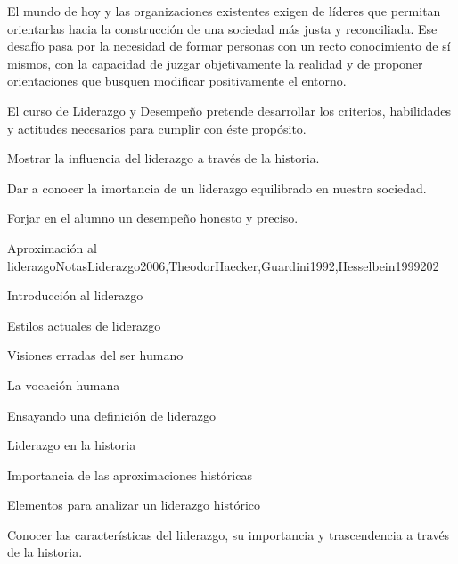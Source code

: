 \begin{syllabus}


\begin{justification}
El mundo de hoy y las organizaciones existentes exigen de líderes que permitan orientarlas hacia la construcción de una sociedad más justa y reconciliada.  Ese desafío pasa por la necesidad de formar personas con un recto conocimiento de sí mismos, con la capacidad de juzgar objetivamente la realidad y de proponer orientaciones que busquen modificar positivamente el entorno.

El curso de Liderazgo y Desempeño pretende desarrollar los criterios, habilidades y actitudes necesarios para cumplir con éste propósito.
\end{justification}

\begin{goals}
\item \OutcomeHU
\item Mostrar la influencia del liderazgo a través de la historia.
\item Dar a conocer la imortancia de un liderazgo equilibrado en nuestra sociedad.
\item Forjar en el alumno un desempeño honesto y preciso.
\end{goals}

\begin{outcomes}
\end{outcomes}

\begin{unit}{Aproximación al liderazgo}{NotasLiderazgo2006,TheodorHaecker,Guardini1992,Hesselbein1999}{20}{2}
\begin{topics}
	\item Introducción al liderazgo
	\item Estilos actuales de liderazgo
	\item Visiones erradas del ser humano
	\item La vocación humana
	\item Ensayando una definición de liderazgo
	\item Liderazgo en la historia
	\item Importancia de las aproximaciones históricas
	\item Elementos para analizar un liderazgo histórico
\end{topics}
\begin{unitgoals}
	\item Conocer las características del liderazgo, su importancia y trascendencia a través de la historia.
\end{unitgoals}
\end{unit}


\end{syllabus}

